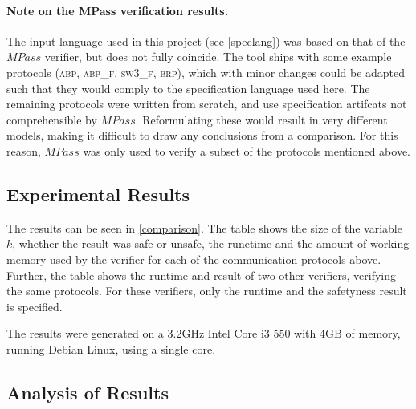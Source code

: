 \paragraph{Note on the MPass verification results.}
The input language used in this project (see \ref{speclang}) was based on that of the $MPass$ verifier, but does not fully coincide. The tool ships with some example protocols (\textsc{abp, abp\_f, sw3\_f, brp}), which with minor changes could be adapted such that they would comply to the specification language used here. The remaining protocols were written from scratch, and use specification artifcats not comprehensible by $MPass$. Reformulating these would result in very different models, making it difficult to draw any conclusions from a comparison. For this reason, $MPass$ was only used to verify a subset of the protocols mentioned above.

\subsection{Experimental Results}
The results can be seen in \ref{comparison}. The table shows the size of the variable $k$, whether the result was safe or unsafe, the runetime and the amount of working memory used by the verifier for each of the communication protocols above. Further, the table shows the runtime and result of two other verifiers, verifying the same protocols. For these verifiers, only the runtime and the safetyness result is specified.

The results were generated on a 3.2GHz Intel Core i3 550 with 4GB of memory, running Debian Linux, using a single core.

\subsection{Analysis of Results}


